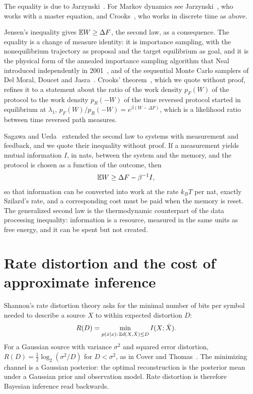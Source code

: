 The equality is due to Jarzynski~\cite{jarzynski1997}. For Markov dynamics see Jarzynski~\cite{jarzynski1997master}, who works with a master equation, and Crooks~\cite{crooks2000}, who works in discrete time as above.

Jensen's inequality gives $\mathbb{E} W\geq\Delta F$, the second law, as a consequence. The equality is a change of measure identity: it is importance sampling, with the nonequilibrium trajectory as proposal and the target equilibrium as goal, and it is the physical form of the annealed importance sampling algorithm that Neal introduced independently in 2001~\cite{neal2001}, and of the sequential Monte Carlo samplers of Del Moral, Doucet and Jasra~\cite{delmoral2006}. Crooks' theorem~\cite{crooks1999}, which we quote without proof, refines it to a statement about the ratio of the work density $p_F(W)$ of the protocol to the work density $p_R(-W)$ of the time reversed protocol started in equilibrium at $\lambda_1$, $p_F(W)/p_R(-W) = e^{\beta(W-\Delta F)}$, which is a likelihood ratio between time reversed path measures.

Sagawa and Ueda~\cite{sagawaueda2010} extended the second law to systems with measurement and feedback, and we quote their inequality without proof. If a measurement yields mutual information $I$, in nats, between the system and the memory, and the protocol is chosen as a function of the outcome, then
\[
\mathbb{E} W\geq\Delta F-\beta^{-1}I,
\]
so that information can be converted into work at the rate $k_BT$ per nat, exactly Szilard's rate, and a corresponding cost must be paid when the memory is reset. The generalized second law is the thermodynamic counterpart of the data processing inequality: information is a resource, measured in the same units as free energy, and it can be spent but not created.

\section{Rate distortion and the cost of approximate inference}

Shannon's rate distortion theory asks for the minimal number of bits per symbol needed to describe a source $X$ to within expected distortion $D$:
\[
R(D) = \min_{p(\hat x\mid x):\,\mathbb{E} d(X,\hat X)\leq D}I(X;\hat X).
\]
For a Gaussian source with variance $\sigma^2$ and squared error distortion, $R(D) = \frac12\log_2(\sigma^2/D)$ for $D<\sigma^2$, as in Cover and Thomas~\cite{covertomas}. The minimizing channel is a Gaussian posterior: the optimal reconstruction is the posterior mean under a Gaussian prior and observation model. Rate distortion is therefore Bayesian inference read backwards.

